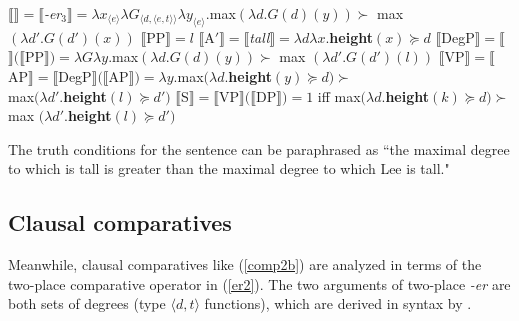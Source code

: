 \documentclass[output=paper,
modfonts
]{langscibook}
\begin{document}





\begin{exe}
\ex\label{derivation2ch2}
\begin{xlist}
\ex
$\llbracket$$\rrbracket = \llbracket${\it-er}$_3\rrbracket =  \lambda x_{\langle e\rangle}\lambda G_{\langle d, \langle e,t \rangle\rangle}\lambda y_{\langle e\rangle}.$max$(\lambda d.G(d)(y))\succ$ max $(\lambda d'.G(d')(x))$
\ex
$\llbracket$PP$\rrbracket = l$
\ex
$\llbracket$A$'\rrbracket = \llbracket${\it tall}$\rrbracket = \lambda d\lambda x.${\bf height}$(x) \succeq d$
\ex 
$\llbracket$DegP$\rrbracket = \llbracket$$\rrbracket(\llbracket$PP$\rrbracket) = 
\lambda G\lambda y.$max$(\lambda d.G(d)(y))\succ$ max $(\lambda d'.G(d')(l))$ 
\ex 
$\llbracket$VP$\rrbracket = \llbracket$AP$\rrbracket = \llbracket$DegP$\rrbracket(\llbracket$AP$\rrbracket) = \lambda y.$max$(\lambda d.${\bf height}$(y) \succeq d)\succ$\\\hspace*{60mm} max$(\lambda d'.${\bf height}$(l) \succeq d')$
\ex\label{derivation2ch2c} 
$\llbracket$S$\rrbracket$$=$$\llbracket$VP$\rrbracket(\llbracket$DP$\rrbracket)$$=$$1$ iff  max$(\lambda d.${\bf height}$(k) \succeq d)\succ$ max $(\lambda d'.${\bf height}$(l) \succeq d')$
\end{xlist}

\end{exe}


The truth conditions for the sentence can be paraphrased as ``the maximal degree to which  is tall is greater than the maximal degree to which Lee is tall."




\subsection{Clausal comparatives}


Meanwhile, clausal comparatives like (\ref{comp2b}) are analyzed in terms of the two-place comparative operator in (\ref{er2}). The two arguments of two-place {\it-er} are both sets of degrees (type $\langle d, t\rangle$ functions), which are derived in syntax by .
\end{document}
